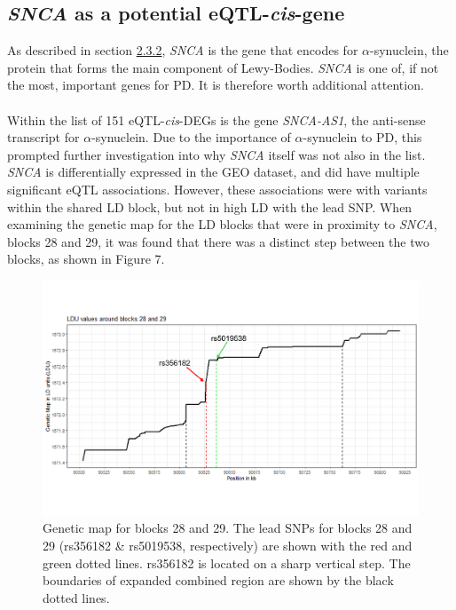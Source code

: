 \documentclass{article}
\begin{document}
\subsection{\textit{SNCA} as a potential eQTL-\textit{cis}-gene}
\label{subsec:SNCA}
As described in section \hyperref[subsubsec:synuclein]{2.3.2}, \textit{SNCA} is the gene that encodes for $\alpha$-synuclein, the protein that forms the main component of Lewy-Bodies. \textit{SNCA} is one of, if not the most, important genes for PD. It is therefore worth additional attention.
\\
\\Within the list of 151 eQTL-\textit{cis}-DEGs is the gene \textit{SNCA-AS1}, the anti-sense transcript for $\alpha$-synuclein. Due to the importance of $\alpha$-synuclein to PD, this prompted further investigation into why \textit{SNCA} itself was not also in the list. \textit{SNCA} is differentially expressed in the GEO dataset, and did have multiple significant eQTL associations. However, these associations were with variants within the shared LD block, but not in high LD with the lead SNP. When examining the genetic map for the LD blocks that were in proximity to \textit{SNCA}, blocks 28 and 29, it was found that there was a distinct step between the two blocks, as shown in Figure 7.
\begin{figure}[!h]
    \centering
    \includegraphics[width=1\linewidth]{Thesis/thesis images/Blocks28and29.png}
    \caption{Genetic map for blocks 28 and 29. The lead SNPs for blocks 28 and 29 (rs356182 \& rs5019538, respectively) are shown with the red and green dotted lines. rs356182 is located on a sharp vertical step. The boundaries of expanded combined region are shown by the black dotted lines.}
    \label{fig:blocks28and29}
\end{figure}
\end{document}
